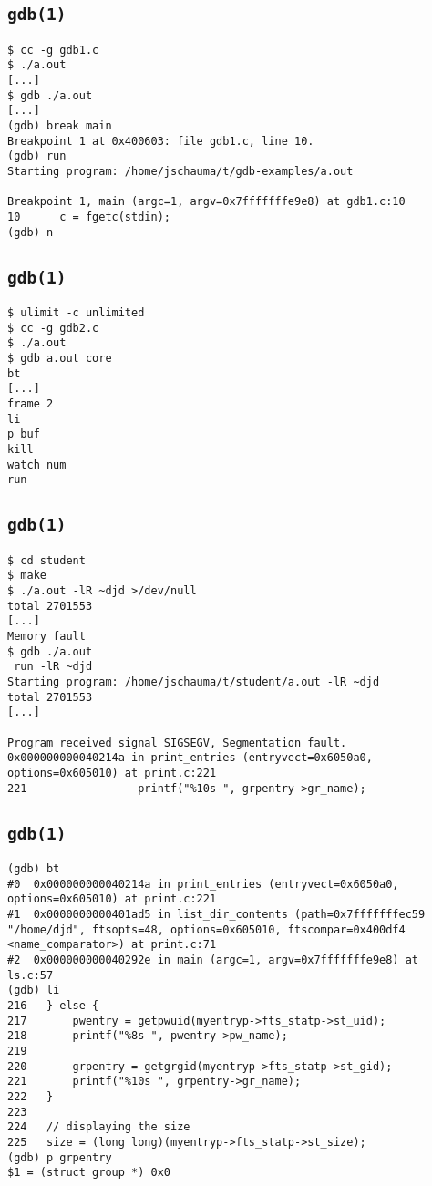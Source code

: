 \documentclass[xga]{xdvislides}
\begin{document}
\subsection{{\tt gdb(1)}}
\begin{verbatim}
$ cc -g gdb1.c
$ ./a.out
[...]
$ gdb ./a.out
[...]
(gdb) break main
Breakpoint 1 at 0x400603: file gdb1.c, line 10.
(gdb) run
Starting program: /home/jschauma/t/gdb-examples/a.out

Breakpoint 1, main (argc=1, argv=0x7fffffffe9e8) at gdb1.c:10
10		c = fgetc(stdin);
(gdb) n

\end{verbatim}

\subsection{{\tt gdb(1)}}
\begin{verbatim}
$ ulimit -c unlimited
$ cc -g gdb2.c
$ ./a.out
$ gdb a.out core
bt
[...]
frame 2
li
p buf
kill
watch num
run
\end{verbatim}

\subsection{{\tt gdb(1)}}
\begin{verbatim}
$ cd student
$ make
$ ./a.out -lR ~djd >/dev/null
total 2701553
[...]
Memory fault
$ gdb ./a.out
 run -lR ~djd
Starting program: /home/jschauma/t/student/a.out -lR ~djd
total 2701553
[...]

Program received signal SIGSEGV, Segmentation fault.
0x000000000040214a in print_entries (entryvect=0x6050a0, options=0x605010) at print.c:221
221	                printf("%10s ", grpentry->gr_name);
\end{verbatim}

\subsection{{\tt gdb(1)}}
\begin{verbatim}
(gdb) bt
#0  0x000000000040214a in print_entries (entryvect=0x6050a0, options=0x605010) at print.c:221
#1  0x0000000000401ad5 in list_dir_contents (path=0x7fffffffec59 "/home/djd", ftsopts=48, options=0x605010, ftscompar=0x400df4 <name_comparator>) at print.c:71
#2  0x000000000040292e in main (argc=1, argv=0x7fffffffe9e8) at ls.c:57
(gdb) li
216	  } else {
217	      pwentry = getpwuid(myentryp->fts_statp->st_uid);
218	      printf("%8s ", pwentry->pw_name);
219
220	      grpentry = getgrgid(myentryp->fts_statp->st_gid);
221	      printf("%10s ", grpentry->gr_name);
222	  }
223
224	  // displaying the size
225	  size = (long long)(myentryp->fts_statp->st_size);
(gdb) p grpentry
$1 = (struct group *) 0x0
\end{verbatim}
\end{document}
